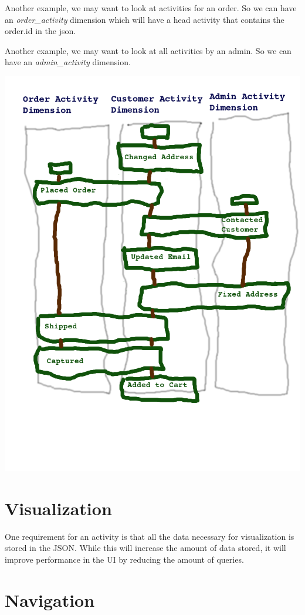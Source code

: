 \documentclass[11pt]{article}
\begin{document}
Another example, we may want to look at activities for an order. So we can have an \emph{order\_activity}
dimension which will have a head activity that contains the order.id in the json.

Another example, we may want to look at all activities by an admin. So we can have an \emph{admin\_activity}
dimension.

\includegraphics[scale=0.40]{dimension}

\section{Visualization}

One requirement for an activity is that all the data necessary for visualization is stored
in the JSON. While this will increase the amount of data stored, it will improve performance
in the UI by reducing the amount of queries. 

\section{Navigation}
\end{document}
